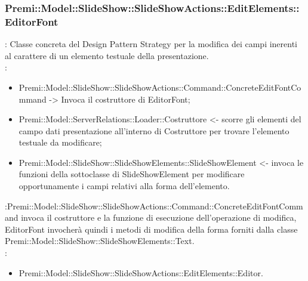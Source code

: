 {                    \subsubsection{Premi::Model::SlideShow::SlideShowActions::EditElements::EditorFont}{
				\textbf{\tipo}: Classe concreta del Design Pattern Strategy per la modifica dei campi inerenti al carattere di un elemento testuale della presentazione.\\	
				\textbf{\relaz}: 
				\begin{itemize}
					\item Premi::Model::SlideShow::SlideShowActions::Command::ConcreteEditFontCommand -> Invoca il costruttore di EditorFont;
                    \item Premi::Model::ServerRelations::Loader::Costruttore <- scorre gli elementi del campo dati presentazione all'interno di Costruttore per trovare l'elemento testuale da modificare; 
                    \item Premi::Model::SlideShow::SlideShowElements::SlideShowElement <- invoca le funzioni della sottoclasse di SlideShowElement per modificare opportunamente i campi relativi alla forma dell’elemento.
				\end{itemize}	\textbf{\interfacce}:Premi::Model::SlideShow::SlideShowActions::Command::ConcreteEditFontCommand invoca il costruttore e la funzione di esecuzione dell’operazione di modifica, EditorFont invocherà quindi i metodi di modifica della forma forniti dalla classe Premi::Model::SlideShow::SlideShowElements::Text.\\
                \textbf{\base}: 
                    \begin{itemize}
                    \item Premi::Model::SlideShow::SlideShowActions::EditElements::Editor.
                    \end{itemize}
                    }
                }
